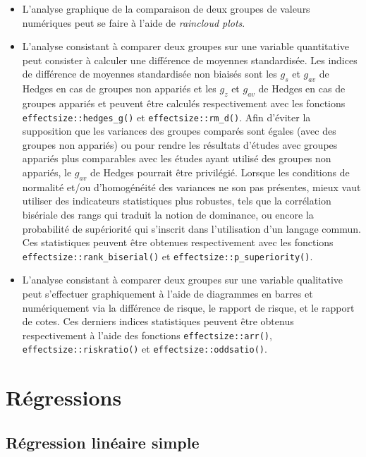 \documentclass[
  letterpaper,
]{book}
\providecommand{\tightlist}{%
  \setlength{\itemsep}{0pt}\setlength{\parskip}{0pt}}\usepackage{longtable,booktabs,array}
\begin{document}
\begin{itemize}
\tightlist
\item
  L'analyse graphique de la comparaison de deux groupes de valeurs
  numériques peut se faire à l'aide de \emph{raincloud plots}.
\item
  L'analyse consistant à comparer deux groupes sur une variable
  quantitative peut consister à calculer une différence de moyennes
  standardisée. Les indices de différence de moyennes standardisée non
  biaisés sont les \(g_{s}\) et \(g_{av}\) de Hedges en cas de groupes
  non appariés et les \(g_{z}\) et \(g_{av}\) de Hedges en cas de
  groupes appariés et peuvent être calculés respectivement avec les
  fonctions \texttt{effectsize::hedges\_g()} et
  \texttt{effectsize::rm\_d()}. Afin d'éviter la supposition que les
  variances des groupes comparés sont égales (avec des groupes non
  appariés) ou pour rendre les résultats d'études avec groupes appariés
  plus comparables avec les études ayant utilisé des groupes non
  appariés, le \(g_{av}\) de Hedges pourrait être privilégié. Lorsque
  les conditions de normalité et/ou d'homogénéité des variances ne son
  pas présentes, mieux vaut utiliser des indicateurs statistiques plus
  robustes, tels que la corrélation bisériale des rangs qui traduit la
  notion de dominance, ou encore la probabilité de supériorité qui
  s'inscrit dans l'utilisation d'un langage commun. Ces statistiques
  peuvent être obtenues respectivement avec les fonctions
  \texttt{effectsize::rank\_biserial()} et
  \texttt{effectsize::p\_superiority()}.
\item
  L'analyse consistant à comparer deux groupes sur une variable
  qualitative peut s'effectuer graphiquement à l'aide de diagrammes en
  barres et numériquement via la différence de risque, le rapport de
  risque, et le rapport de cotes. Ces derniers indices statistiques
  peuvent être obtenus respectivement à l'aide des fonctions
  \texttt{effectsize::arr()}, \texttt{effectsize::riskratio()} et
  \texttt{effectsize::oddsatio()}.
\end{itemize}

\chapter{Régressions}\label{ruxe9gressions}

\section{Régression linéaire
simple}\label{ruxe9gression-linuxe9aire-simple}
\end{document}
